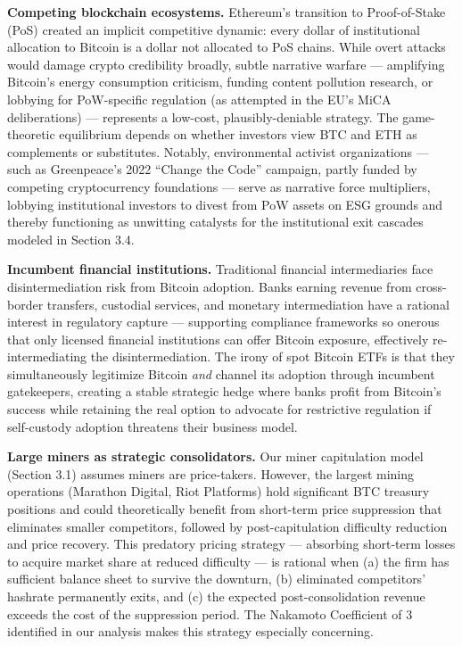 \documentclass[
  11pt,
]{article}
\begin{document}
\textbf{Competing blockchain ecosystems.} Ethereum's transition to
Proof-of-Stake (PoS) created an implicit competitive dynamic: every
dollar of institutional allocation to Bitcoin is a dollar not allocated
to PoS chains. While overt attacks would damage crypto credibility
broadly, subtle narrative warfare --- amplifying Bitcoin's energy
consumption criticism, funding content pollution research, or lobbying
for PoW-specific regulation (as attempted in the EU's MiCA
deliberations) --- represents a low-cost, plausibly-deniable strategy.
The game-theoretic equilibrium depends on whether investors view BTC and
ETH as complements or substitutes. Notably, environmental activist
organizations --- such as Greenpeace's 2022 ``Change the Code''
campaign, partly funded by competing cryptocurrency foundations ---
serve as narrative force multipliers, lobbying institutional investors
to divest from PoW assets on ESG grounds and thereby functioning as
unwitting catalysts for the institutional exit cascades modeled in
Section 3.4.

\textbf{Incumbent financial institutions.} Traditional financial
intermediaries face disintermediation risk from Bitcoin adoption. Banks
earning revenue from cross-border transfers, custodial services, and
monetary intermediation have a rational interest in regulatory capture
--- supporting compliance frameworks so onerous that only licensed
financial institutions can offer Bitcoin exposure, effectively
re-intermediating the disintermediation. The irony of spot Bitcoin ETFs
is that they simultaneously legitimize Bitcoin \emph{and} channel its
adoption through incumbent gatekeepers, creating a stable strategic
hedge where banks profit from Bitcoin's success while retaining the real
option to advocate for restrictive regulation if self-custody adoption
threatens their business model.

\textbf{Large miners as strategic consolidators.} Our miner capitulation
model (Section 3.1) assumes miners are price-takers. However, the
largest mining operations (Marathon Digital, Riot Platforms) hold
significant BTC treasury positions and could theoretically benefit from
short-term price suppression that eliminates smaller competitors,
followed by post-capitulation difficulty reduction and price recovery.
This predatory pricing strategy --- absorbing short-term losses to
acquire market share at reduced difficulty --- is rational when (a) the
firm has sufficient balance sheet to survive the downturn, (b)
eliminated competitors' hashrate permanently exits, and (c) the expected
post-consolidation revenue exceeds the cost of the suppression period.
The Nakamoto Coefficient of 3 identified in our analysis makes this
strategy especially concerning.
\end{document}
